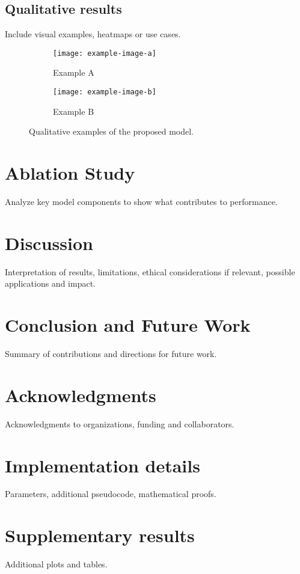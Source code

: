 \documentclass[10pt,twocolumn]{article}
\theoremstyle{definition}
\theoremstyle{plain}
\begin{document}
\subsection{Qualitative results}
Include visual examples, heatmaps or use cases.

\begin{figure}[H]
  \centering
  \begin{subfigure}[b]{0.45\linewidth}
    \texttt{[image: example-image-a]}
    \caption{Example A}
  \end{subfigure}
  \hfill
  \begin{subfigure}[b]{0.45\linewidth}
    \texttt{[image: example-image-b]}
    \caption{Example B}
  \end{subfigure}
  \caption{Qualitative examples of the proposed model.}
  \label{fig:examples}
\end{figure}

\section{Ablation Study}
Analyze key model components to show what contributes to performance.

\section{Discussion}
Interpretation of results, limitations, ethical considerations if relevant, possible applications and impact.

\section{Conclusion and Future Work}
Summary of contributions and directions for future work.

\section*{Acknowledgments}
Acknowledgments to organizations, funding and collaborators.



\appendix
\section{Implementation details}
Parameters, additional pseudocode, mathematical proofs.

\section{Supplementary results}
Additional plots and tables.
\end{document}

